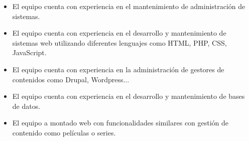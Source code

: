 \begin{itemize}

\item El equipo cuenta con experiencia en el mantenimiento de administración de sistemas.
\item El equipo cuenta con experiencia en el desarrollo y mantenimiento de sistemas web utilizando diferentes lenguajes como HTML, PHP, CSS, JavaScript.
\item El equipo cuenta con experiencia en la administración de gestores de contenidos como Drupal, Wordpress... 
\item El equipo cuenta con experiencia en el desarrollo y mantenimiento de bases de datos.
\item El equipo a montado web con funcionalidades similares con gestión de contenido como películas o series.

\end{itemize}